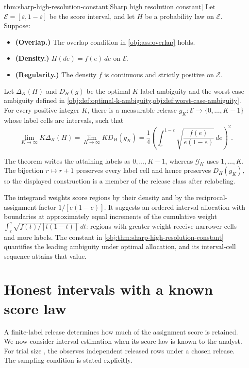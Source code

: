 \documentclass[11pt]{article}
\begin{document}
\begin{theoremv}{thm:sharp-high-resolution-constant}[Sharp high resolution constant]
Let \(\mathcal E=[\varepsilon,1-\varepsilon]\) be the score interval, and let \(H\) be a probability law on \(\mathcal E\). Suppose:
\begin{itemize}
\item \textbf{(Overlap.)} The overlap condition in \cref{obj:ass:overlap} holds.
\item \textbf{(Density.)} \(H(de)=f(e)\,de\) on \(\mathcal E\).
\item \textbf{(Regularity.)} The density \(f\) is continuous and strictly positive on \(\mathcal E\).
\end{itemize}
Let \(\Delta_K(H)\) and \(D_H(g)\) be the optimal \(K\)-label ambiguity and the worst-case ambiguity defined in \cref{obj:def:optimal-k-ambiguity,obj:def:worst-case-ambiguity}. For every positive integer \(K\), there is a measurable release \(g_K:\mathcal E\to\{0,\ldots,K-1\}\) whose label cells are intervals, such that
\[
\lim_{K\to\infty}K\Delta_K(H)
=
\lim_{K\to\infty}K D_H(g_K)
=
\frac14\left(
\int_{\varepsilon}^{1-\varepsilon}
\sqrt{\frac{f(e)}{e(1-e)}}\,de
\right)^2.
\]
\end{theoremv}

The theorem writes the attaining labels as \(0,\ldots,K-1\), whereas \(\mathcal G_K\) uses \(1,\ldots,K\). The bijection \(r\mapsto r+1\) preserves every label cell and hence preserves \(D_H(g_K)\), so the displayed construction is a member of the release class after relabeling.

The integrand weights score regions by their density and by the reciprocal-assignment factor \(1/[e(1-e)]\). It suggests an ordered interval allocation with boundaries at approximately equal increments of the cumulative weight \(\int_{\varepsilon}^{e}\sqrt{f(t)/[t(1-t)]}\,dt\): regions with greater weight receive narrower cells and more labels. The constant in \cref{obj:thm:sharp-high-resolution-constant} quantifies the leading ambiguity under optimal allocation, and its interval-cell sequence attains that value.


\section{Honest intervals with a known score law}

A finite-label release determines how much of the assignment score is retained. We now consider interval estimation when its score law is known to the analyst. For trial size , the  observes independent released rows under a chosen release. The sampling condition is stated explicitly.
\end{document}
